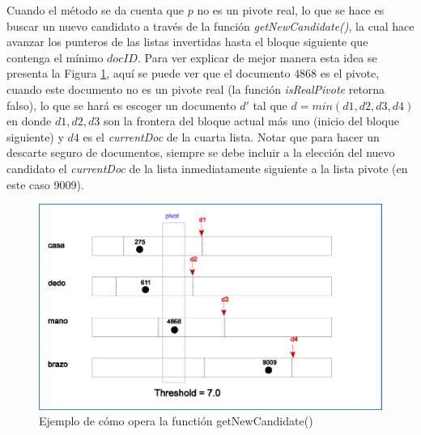 Cuando el método se da cuenta que $p$ no es un pivote real, lo que se hace es buscar un nuevo candidato a través de la función \textit{getNewCandidate()}, la cual hace avanzar los punteros de las listas invertidas hasta el bloque siguiente que contenga el mínimo $docID$. Para ver explicar de mejor manera esta idea se presenta la Figura \ref{fig:getNewCandidate}, aquí se puede ver que el documento $4868$ es el pivote, cuando este documento no es un pivote real (la función \textit{isRealPivote} retorna falso), lo que se hará es escoger un documento $d'$ tal que $d = min(d1,d2,d3,d4)$ en donde $d1,d2,d3$ son la frontera del bloque actual más uno (inicio del bloque siguiente) y $d4$ es el \textit{currentDoc} de la cuarta lista. Notar que para hacer un descarte seguro de documentos, siempre se debe incluir a la elección del nuevo candidato el \textit{currentDoc} de la lista inmediatamente siguiente a la lista pivote (en este caso 9009).  

\begin{figure}[!th]
\centering
\includegraphics[scale=.75]{images/get_new_candidate.eps}
\caption{Ejemplo de cómo opera la functión getNewCandidate()}
\label{fig:getNewCandidate}
\end{figure}%


